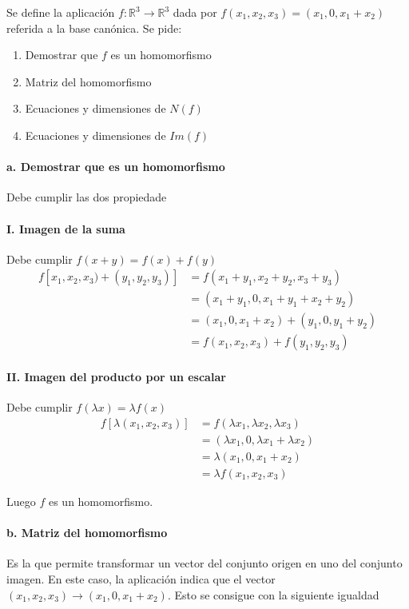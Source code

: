 \begin{problema}{\cite[10p346]{palacios}}{
	Se define la aplicación $f:\mathbb{R}^3\rightarrow\mathbb{R}^3$ dada por
	$f(x_1,x_2,x_3)=(x_1,0,x_1+x_2)$ referida a la base canónica.
	Se pide:
	\begin{enumerate}
	\item Demostrar que $f$ es un homomorfismo
	\item Matriz del homomorfismo
	\item Ecuaciones y dimensiones de $N(f)$
	\item Ecuaciones y dimensiones de $Im(f)$
	\end{enumerate}
	}
	\paragraph{a. Demostrar que es un homomorfismo} Debe cumplir las dos propiedade

	\paragraph{I. Imagen de la suma} Debe cumplir $f(x+y)=f(x)+f(y)$ 
	\begin{align*}
		f[x_1,x_2,x_3)+(y_1,y_2,y_3)] &=f(x_1+y_1,x_2+y_2,x_3+y_3)\\
		&=(x_1+y_1,0,x_1+y_1+x_2+y_2)\\
		&=(x_1,0,x_1+x_2)+(y_1,0,y_1+y_2)\\
		&=f(x_1,x_2,x_3)+f(y_1,y_2,y_3)
	\end{align*}

	\paragraph{II. Imagen del producto por un escalar} Debe cumplir $f(\lambda x)=\lambda f(x)$ 
	\begin{align*}
		f[\lambda(x_1,x_2,x_3)] &= f(\lambda x_1, \lambda x_2, \lambda x_3) \\
		&= (\lambda x_1, 0, \lambda x_1 + \lambda x_2) \\
		&= \lambda(x_1, 0, x_1+x_2) \\
		&= \lambda f(x_1, x_2, x_3)
	\end{align*}

	Luego $f$ es un homomorfismo.

	\paragraph{b. Matriz del homomorfismo} Es la que permite transformar un vector del conjunto
	origen en uno del conjunto imagen. En este caso, la aplicación indica que el vector
	$(x_1,x_2,x_3)
	\rightarrow(x_1,0,x_1+x_2)$. Esto se consigue con la siguiente igualdad


\end{problema}
